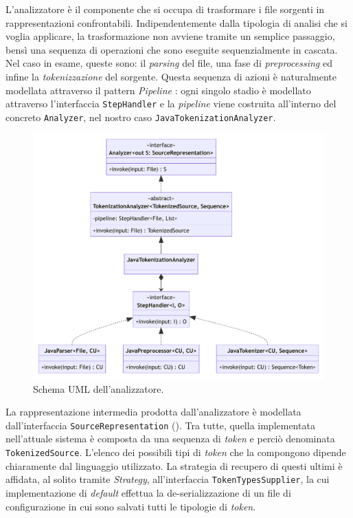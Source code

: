 L'analizzatore è il componente che si occupa di trasformare i file sorgenti in rappresentazioni confrontabili.
%
Indipendentemente dalla tipologia di analisi che si voglia applicare, la trasformazione non avviene tramite un semplice passaggio, bensì una sequenza di operazioni che sono eseguite sequenzialmente in cascata.
%
Nel caso in esame, queste sono: il \textit{parsing} del file, una fase di \textit{preprocessing} ed infine la \textit{tokenizzazione} del sorgente.
%
Questa sequenza di azioni è naturalmente modellata attraverso il pattern \textit{Pipeline} \cite{pipeline-pattern}: ogni singolo stadio è modellato attraverso l'interfaccia \texttt{StepHandler} e la \textit{pipeline} viene costruita all'interno del concreto \texttt{Analyzer}, nel nostro caso \texttt{JavaTokenizationAnalyzer}.

\begin{figure}[h!]
    \centering
    \includegraphics[width=\textwidth]{resources/img/02-analyzer.pdf}
    \caption{Schema UML dell'analizzatore.}
    \label{img:02-analyzer}
\end{figure}

La rappresentazione intermedia prodotta dall'analizzatore è modellata dall'interfaccia \texttt{SourceRepresentation} (). 
%
Tra tutte, quella implementata nell'attuale sistema è composta da una sequenza di \textit{token} e perciò denominata \texttt{TokenizedSource}.
%
L'elenco dei possibili tipi di \textit{token} che la compongono dipende chiaramente dal linguaggio utilizzato.
%
La strategia di recupero di questi ultimi è affidata, al solito tramite \textit{Strategy}, all'interfaccia \texttt{TokenTypesSupplier}, la cui implementazione di \textit{default} effettua la de-serializzazione di un file di configurazione in cui sono salvati tutti le tipologie di \textit{token}.

